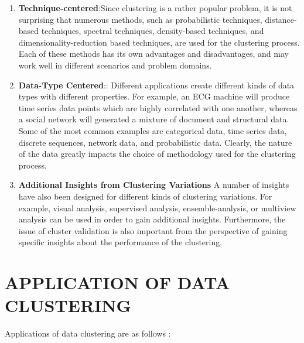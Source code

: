 \documentclass[letterpaper, 10 pt, conference]{ieeeconf}  %
\begin{document}
\begin{enumerate}
\item \textbf{Technique-centered}:Since clustering is a rather popular problem, it is not surprising that numerous methods, such as probabilistic techniques, distance-based techniques, spectral techniques, density-based techniques, and dimensionality-reduction based techniques, are used for the clustering process. Each of these methods has its own advantages and disadvantages, and may work well in different scenarios and problem domains.\\
\item \textbf{Data-Type Centered}:: Different applications create different kinds of data types with different properties. For example, an ECG machine will produce time series data points which are highly correlated with one another, whereas a social network will generated a mixture of
document and structural data. Some of the most common examples are categorical data, time series data, discrete sequences, network data, and probabilistic data. Clearly, the nature of the data greatly impacts the choice of methodology used for the clustering process. 
\item \textbf{Additional Insights from Clustering Variations} A number of insights have also been designed
for different kinds of clustering variations. For example, visual analysis, supervised analysis, ensemble-analysis, or multiview analysis can be used in order to gain additional insights.
Furthermore, the issue of cluster validation is also important from the perspective of gaining specific insights about the performance of the clustering.
\end{enumerate}
\section{APPLICATION OF DATA CLUSTERING}
Applications of data clustering are as follows :
\end{document}
